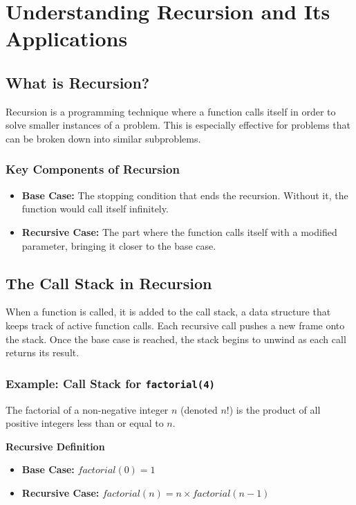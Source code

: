 \section{Understanding Recursion and Its Applications}
\subsection{What is Recursion?}

Recursion is a programming technique where a function calls itself in order to solve smaller instances of a problem. This is especially effective for problems that can be broken down into similar subproblems.

\subsubsection*{Key Components of Recursion}
\begin{itemize}
    \item \textbf{Base Case:} The stopping condition that ends the recursion. Without it, the function would call itself infinitely.
    \item \textbf{Recursive Case:} The part where the function calls itself with a modified parameter, bringing it closer to the base case.
\end{itemize}

\subsection{The Call Stack in Recursion}

When a function is called, it is added to the call stack, a data structure that keeps track of active function calls. Each recursive call pushes a new frame onto the stack. Once the base case is reached, the stack begins to unwind as each call returns its result.

\subsubsection*{Example: Call Stack for \texttt{factorial(4)}}

The factorial of a non-negative integer $n$ (denoted $n!$) is the product of all positive integers less than or equal to $n$.

\textbf{Recursive Definition}

\begin{itemize}
    \item \textbf{Base Case:} $factorial(0) = 1$
    \item \textbf{Recursive Case:} $factorial(n) = n \times factorial(n - 1)$
\end{itemize}

